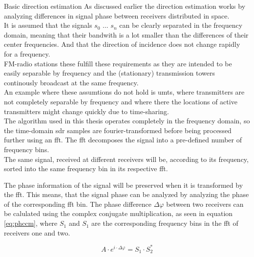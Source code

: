 \begin{subchapter}{Basic direction estimation}
  As discussed earlier the direction estimation works by
  analyzing differences in signal phase between receivers
  distributed in space. \\

  It is assumed that the signals $s_0$ ... $s_n$
  can be clearly separated in the frequency domain,
  meaning that their bandwith is a lot smaller than
  the differences of their center frequencies.
  And that the direction of incidence does not
  change rapidly for a frequency. \\

  FM-radio stations these fulfill these requirements
  as they are intended to be easily separable by
  frequency and the (stationary) transmission towers continously
  broadcast at the same frequency. \\

  An example where these assumtions do not hold is
  \acrshort{umts}, where transmitters are not completely
  separable by frequency and where there the locations
  of active transmitters might change quickly due
  to time-sharing. \\

  The algorithm used in this thesis operates completely
  in the frequency domain, so the time-domain \gls{sdr}
  samples are fourier-transformed before being processed
  further using an \gls{fft}.
  The \gls{fft} decomposes the signal into a pre-defined
  number of frequency bins. \\

  The same signal, received at different receivers will
  be, according to its frequency, sorted into the same
  frequency bin in its respective \gls{fft}.

  The phase information of the signal will be preserved
  when it is transformed by the \gls{fft}.
  This means, that the signal phase can be analyzed by
  analyzing the phase of the corresponding \gls{fft}
  bin.
  The phase difference $\Delta \varphi$ between two
  receivers can be calulated using the complex conjugate
  multiplication, as seen in equation \ref{eq:phccm},
  where $S_\text{1}$ and $S_\text{1}$ are the corresponding
  frequency bins in the \gls{fft} of receivers one and two.

  \begin{equation}
    \label{eq:phccm}
    A \cdot e^{i \cdot \Delta \varphi}
    = S_\text{1} \cdot S_\text{2}^\ast
  \end{equation}


\end{subchapter}
